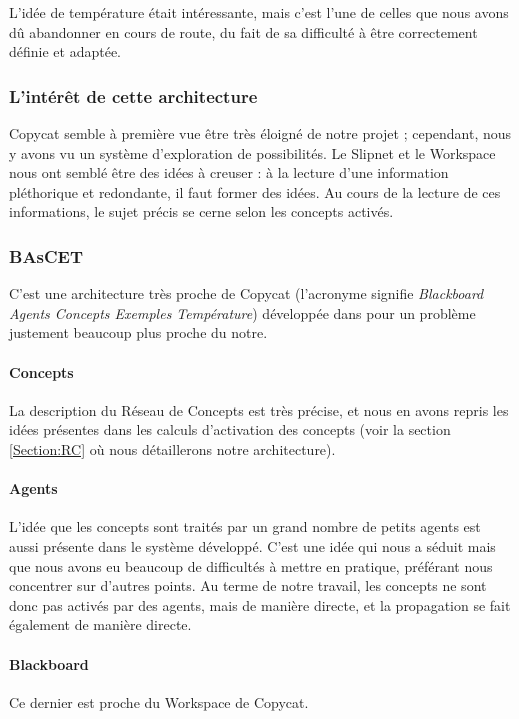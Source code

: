 \documentclass[a4paper, 12pt]{article}
\begin{document}
L'idée de température était intéressante, mais c'est l'une de celles que nous avons dû abandonner en cours de route, du fait de sa difficulté à être correctement définie et adaptée.

\subsubsection{L'intérêt de cette architecture}

Copycat semble à première vue être très éloigné de notre projet ; cependant, nous y avons vu un système d'exploration de possibilités. Le Slipnet et le Workspace nous ont semblé être des idées à creuser : à la lecture d'une information pléthorique et redondante, il faut former des idées. Au cours de la lecture de ces informations, le sujet précis se cerne selon les concepts activés.

\subsubsection{BAsCET}

C'est une architecture très proche de Copycat (l'acronyme signifie \textit{Blackboard Agents Concepts Exemples Température}) développée dans \cite{parmentier_specification_1998} pour un problème justement beaucoup plus proche du notre.

\paragraph{Concepts}
La description du Réseau de Concepts est très précise, et nous en avons repris les idées présentes dans les calculs d'activation des concepts (voir la section \ref{Section:RC} où nous détaillerons notre architecture).

\paragraph{Agents}
L'idée que les concepts sont traités par un grand nombre de petits agents est aussi présente dans le système développé. C'est une idée qui nous a séduit mais que nous avons eu beaucoup de difficultés à mettre en pratique, préférant nous concentrer sur d'autres points. Au terme de notre travail, les concepts ne sont donc pas activés par des agents, mais de manière directe, et la propagation se fait également de manière directe.


\paragraph{Blackboard}
Ce dernier est proche du Workspace de Copycat.
\end{document}
